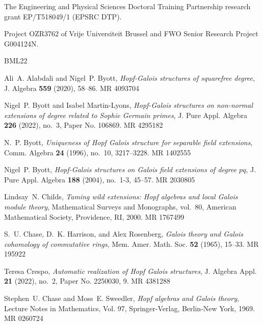 \documentclass[a4paper,reqno]{amsart}
\theoremstyle{definition}
\begin{document}
The Engineering and Physical Sciences Doctoral Training Partnership research grant EP/T518049/1 (EPSRC DTP).

Project OZR3762 of Vrije Universiteit
Brussel and FWO Senior Research Project G004124N.

\providecommand{\bysame}{\leavevmode\hbox to3em{\hrulefill}\thinspace}
\providecommand{\MR}{\relax\ifhmode\unskip\space\fi MR }
\providecommand{\MRhref}[2]{%
  \href{http://www.ams.org/mathscinet-getitem?mr=#1}{#2}
}
\providecommand{\href}[2]{#2}
\begin{thebibliography}{BML22}

Ali~A. Alabdali and Nigel~P. Byott, \emph{Hopf-{G}alois structures of
  squarefree degree}, J. Algebra \textbf{559} (2020), 58--86. \MR{4093704}

Nigel~P. Byott and Isabel Martin-Lyons, \emph{Hopf-{G}alois structures on
  non-normal extensions of degree related to {S}ophie {G}ermain primes}, J.
  Pure Appl. Algebra \textbf{226} (2022), no.~3, Paper No. 106869. \MR{4295182}

N.~P. Byott, \emph{Uniqueness of {H}opf {G}alois structure for separable field
  extensions}, Comm. Algebra \textbf{24} (1996), no.~10, 3217--3228.
  \MR{1402555}

Nigel~P. Byott, \emph{Hopf-{G}alois structures on {G}alois field extensions of
  degree {$pq$}}, J. Pure Appl. Algebra \textbf{188} (2004), no.~1-3, 45--57.
  \MR{2030805}

Lindsay~N. Childs, \emph{Taming wild extensions: {H}opf algebras and local
  {G}alois module theory}, Mathematical Surveys and Monographs, vol.~80,
  American Mathematical Society, Providence, RI, 2000. \MR{1767499}

S.~U. Chase, D.~K. Harrison, and Alex Rosenberg, \emph{Galois theory and
  {G}alois cohomology of commutative rings}, Mem. Amer. Math. Soc. \textbf{52}
  (1965), 15--33. \MR{195922}

Teresa Crespo, \emph{Automatic realization of {H}opf {G}alois structures}, J.
  Algebra Appl. \textbf{21} (2022), no.~2, Paper No. 2250030, 9. \MR{4381288}

Stephen~U. Chase and Moss~E. Sweedler, \emph{Hopf algebras and {G}alois
  theory}, Lecture Notes in Mathematics, Vol. 97, Springer-Verlag, Berlin-New
  York, 1969. \MR{0260724}


\end{thebibliography}
\end{document}
